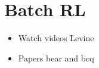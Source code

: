 \chapter{Batch RL}
\begin{itemize}
    \item Watch videos Levine
    \item Papers bear and bcq
\end{itemize}

